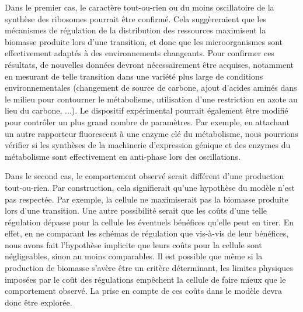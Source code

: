Dans le premier cas, le caractère tout-ou-rien ou du moins oscillatoire de la synthèse des ribosomes pourrait être confirmé.
Cela suggèreraient que les mécanismes de régulation de la distribution des ressources maximisent la biomasse produite lors d'une transition, et donc que les microorganismes sont effectivement adaptés à des environnements changeants.
Pour confirmer ces résultats, de nouvelles données devront nécessairement être acquises, notamment en mesurant de telle transition dans une variété plus large de conditions environnementales (changement de source de carbone, ajout d'acides aminés dans le milieu pour contourner le métabolisme, utilisation d'une restriction en azote au lieu du carbone, ...).
Le dispositif expérimental pourrait également être modifié pour contrôler un plus grand nombre de paramètres.
Par exemple, en attachant un autre rapporteur fluorescent à une enzyme clé du métabolisme, nous pourrions vérifier si les synthèses de la machinerie d'expression génique et des enzymes du métabolisme sont effectivement en anti-phase lors des oscillations.

Dans le second cas, le comportement observé serait différent d'une production tout-ou-rien.
Par construction, cela signifierait qu'une hypothèse du modèle n'est pas respectée.
Par exemple, la cellule ne maximiserait pas la biomasse produite lors d'une transition.
Une autre possibilité serait que les coûts d'une telle régulation dépasse pour la cellule les éventuels bénéfices qu'elle peut en tirer.
En effet, en ne comparant les schémas de régulation que vis-à-vis de leur bénéfices, nous avons fait l'hypothèse implicite que leurs coûts pour la cellule sont négligeables, sinon au moins comparables.
Il est possible que même si la production de biomasse s'avère être un critère déterminant, les limites physiques imposées par le coût des régulations empêchent la cellule de faire mieux que le comportement observé.
La prise en compte de ces coûts dans le modèle devra donc être explorée.

